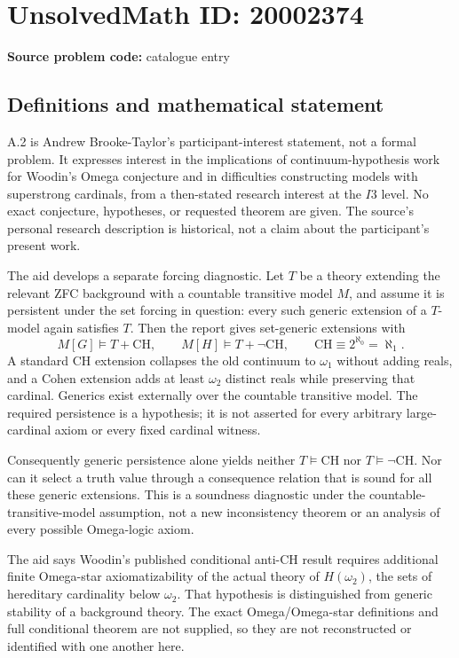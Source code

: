 \documentclass[11pt]{article}
\begin{document}
\section*{UnsolvedMath ID: 20002374}
\textbf{Source problem code:} catalogue entry
\subsection{Definitions and mathematical statement}
A.2 is Andrew Brooke-Taylor's participant-interest statement, not a formal problem. It expresses interest in the implications of continuum-hypothesis work for Woodin's Omega conjecture and in difficulties constructing models with superstrong cardinals, from a then-stated research interest at the \(I3\) level. No exact conjecture, hypotheses, or requested theorem are given. The source's personal research description is historical, not a claim about the participant's present work.

The aid develops a separate forcing diagnostic. Let \(T\) be a theory extending the relevant ZFC background with a countable transitive model \(M\), and assume it is persistent under the set forcing in question: every such generic extension of a \(T\)-model again satisfies \(T\). Then the report gives set-generic extensions with
\[
 M[G]\models T+\mathrm{CH},\qquad
 M[H]\models T+\neg\mathrm{CH},
 \qquad \mathrm{CH}\equiv2^{\aleph_0}=\aleph_1.
\]
A standard CH extension collapses the old continuum to \(\omega_1\) without adding reals, and a Cohen extension adds at least \(\omega_2\) distinct reals while preserving that cardinal. Generics exist externally over the countable transitive model. The required persistence is a hypothesis; it is not asserted for every arbitrary large-cardinal axiom or every fixed cardinal witness.

Consequently generic persistence alone yields neither \(T\models\mathrm{CH}\) nor \(T\models\neg\mathrm{CH}\). Nor can it select a truth value through a consequence relation that is sound for all these generic extensions. This is a soundness diagnostic under the countable-transitive-model assumption, not a new inconsistency theorem or an analysis of every possible Omega-logic axiom.

The aid says Woodin's published conditional anti-CH result requires additional finite Omega-star axiomatizability of the actual theory of \(H(\omega_2)\), the sets of hereditary cardinality below \(\omega_2\). That hypothesis is distinguished from generic stability of a background theory. The exact Omega/Omega-star definitions and full conditional theorem are not supplied, so they are not reconstructed or identified with one another here.
\end{document}
